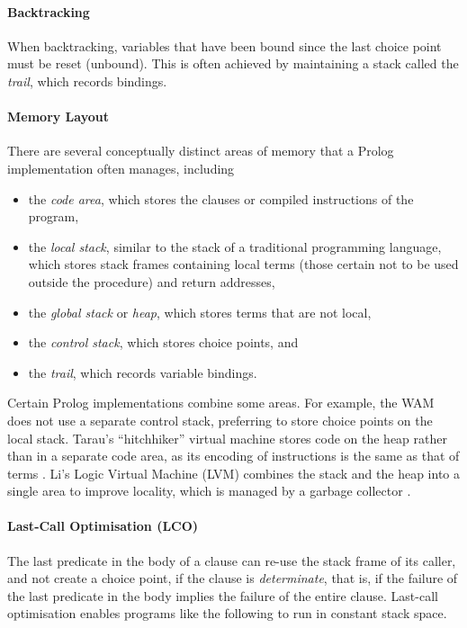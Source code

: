 \paragraph{Backtracking} When backtracking, variables that have been bound since the last choice point must be reset (unbound). This is often achieved by maintaining a stack called the \emph{trail}, which records bindings.

\paragraph{Memory Layout} There are several conceptually distinct areas of memory that a Prolog implementation often manages, including

\begin{itemize}
\item the \emph{code area}, which stores the clauses or compiled instructions of the program,
\item the \emph{local stack}, similar to the stack of a traditional programming language, which stores stack frames containing local terms (those certain not to be used outside the procedure) and return addresses,
\item the \emph{global stack} or \emph{heap}, which stores terms that are not local,
\item the \emph{control stack}, which stores choice points, and
\item the \emph{trail}, which records variable bindings.
\end{itemize}

Certain Prolog implementations combine some areas. For example, the WAM does not use a separate control stack, preferring to store choice points on the local stack. Tarau's ``hitchhiker'' virtual machine stores code on the heap rather than in a separate code area, as its encoding of instructions is the same as that of terms \cite{tarauHitchhikersGuideReinventing2018}. Li's Logic Virtual Machine (LVM) combines the stack and the heap into a single area to improve locality, which is managed by a garbage collector \cite{liEfficientMemoryManagement2000}.

\paragraph{Last-Call Optimisation (LCO)} The last predicate in the body of a clause can re-use the stack frame of its caller, and not create a choice point, if the clause is \emph{determinate}, that is, if the failure of the last predicate in the body implies the failure of the entire clause. Last-call optimisation enables programs like the following to run in constant stack space.

